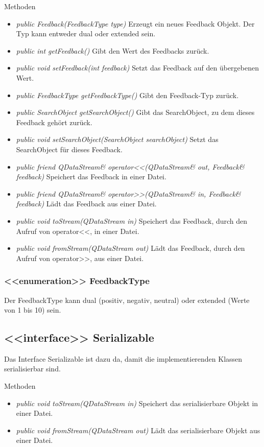 Methoden
\begin{itemize}
\item \textit{public Feedback(FeedbackType type)} Erzeugt ein neues Feedback Objekt. Der Typ kann entweder dual oder extended sein.
\item \textit{public int getFeedback()} Gibt den Wert des Feedbacks zurück.
\item \textit{public void setFeedback(int feedback)} Setzt das Feedback auf den übergebenen Wert.
\item \textit{public FeedbackType getFeedbackType()} Gibt den Feedback-Typ zurück.
\item \textit{public SearchObject getSearchObject()} Gibt das SearchObject, zu dem dieses Feedback gehört zurück.
\item \textit{public void setSearchObject(SearchObject searchObject)} Setzt das SearchObject für dieses Feedback.
\item \textit{public friend QDataStream\& operator<<(QDataStream\& out, Feedback\& feedback)} Speichert das Feedback in einer Datei.
\item \textit{public friend QDataStream\& operator>>(QDataStream\& in, Feedback\& feedback)} Lädt das Feedback aus einer Datei.
\item \textit{public void toStream(QDataStream in)} Speichert das Feedback, durch den Aufruf von operator<<, in einer Datei.
\item \textit{public void fromStream(QDataStream out)} Lädt das Feedback, durch den Aufruf von operator>>, aus einer Datei.
\end{itemize} 

\subsubsection*{<<enumeration>> FeedbackType}
Der FeedbackType kann dual (positiv, negativ, neutral) oder extended (Werte von 1 bis 10) sein.

\subsection*{<<interface>> Serializable}
Das Interface Serializable ist dazu da, damit die implementierenden Klassen serialisierbar sind.

Methoden
\begin{itemize}
\item \textit{public void toStream(QDataStream in)} Speichert das serialisierbare Objekt in einer Datei.
\item \textit{public void fromStream(QDataStream out)} Lädt das serialisierbare Objekt aus einer Datei.
\end{itemize}

